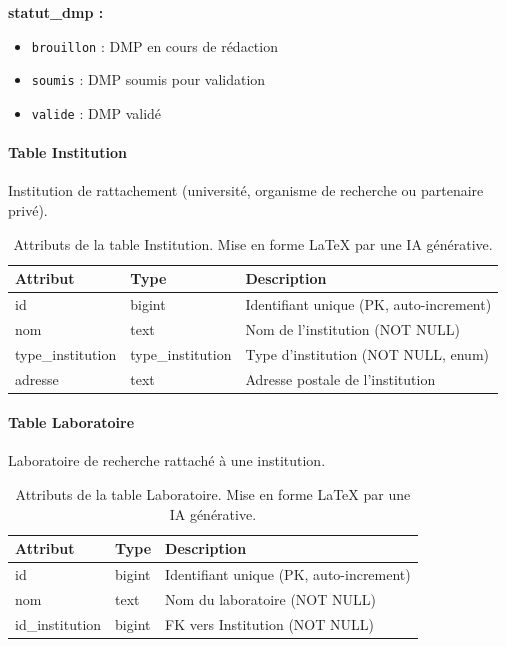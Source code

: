\documentclass[12pt,a4paper]{article}
\begin{document}
\textbf{statut\_dmp :}
\begin{itemize}
    \item \texttt{brouillon} : DMP en cours de rédaction
    \item \texttt{soumis} : DMP soumis pour validation
    \item \texttt{valide} : DMP validé
\end{itemize}

\paragraph{Table Institution}
Institution de rattachement (université, organisme de recherche ou partenaire privé).

\begin{table}[H]
\centering
\small
\begin{tabular}{@{}llp{6cm}@{}}
\toprule
\textbf{Attribut} & \textbf{Type} & \textbf{Description} \\ \midrule
id & bigint & Identifiant unique (PK, auto-increment) \\
nom & text & Nom de l'institution (NOT NULL) \\
type\_institution & type\_institution & Type d'institution (NOT NULL, enum) \\
adresse & text & Adresse postale de l'institution \\ \bottomrule
\end{tabular}
\caption{Attributs de la table Institution. Mise en forme LaTeX par une IA générative.}
\end{table}


\paragraph{Table Laboratoire}
Laboratoire de recherche rattaché à une institution.

\begin{table}[H]
\centering
\small
\begin{tabular}{@{}llp{6cm}@{}}
\toprule
\textbf{Attribut} & \textbf{Type} & \textbf{Description} \\ \midrule
id & bigint & Identifiant unique (PK, auto-increment) \\
nom & text & Nom du laboratoire (NOT NULL) \\
id\_institution & bigint & FK vers Institution (NOT NULL) \\ \bottomrule
\end{tabular}
\caption{Attributs de la table Laboratoire. Mise en forme LaTeX par une IA générative.}
\end{table}
\end{document}
